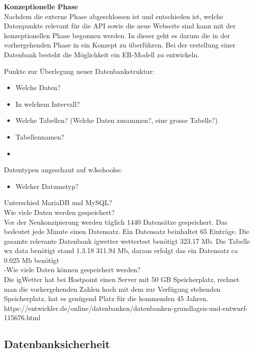 \textbf{Konzeptionelle Phase}\\
Nachdem die externe Phase abgeschlossen ist und entschieden ist, welche Datenpunkte relevant für die API sowie die neue Webseite sind kann mit der konzeptionellen Phase begonnen werden. In dieser geht es darum die in der vorhergehenden Phase in ein Konzept zu überführen. Bei der erstellung einer Datenbank besteht die Möglichkeit ein ER-Modell zu entwickeln. 

Punkte zur Überlegung neuer Datenbankstruktur:
\begin{itemize}
\item Welche Daten?
\item In welchem Intervall?
\item Welche Tabellen? (Welche Daten zusammen?, eine grosse Tabelle?)
\item Tabellennamen?
\item 
\end{itemize}

Datentypen angeschaut auf w3schoolss:
\begin{itemize}
\item Welcher Datumstyp?

\end{itemize}


Unterschied MariaDB und MySQL?\\
Wie viele Daten werden gespeichert?\\
Vor der Neukonzipierung werden täglich 1440 Datensätze gespeichert. Das bedeutet jede Minute einen Datensatz. Ein Datensatz beinhaltet 65 Einträge. Die gesamte relevante Datenbank igwetter wettertest benötigt 323.17  Mb. Die Tabelle wx data benötigt stand 1.3.18 311.94 Mb, daraus erfolgt das ein Datensatz ca 0.025 Mb benötigt \\
-Wie viele Daten können gespeichert werden?\\
Die igWetter hat bei Hostpoint einen Server mit 50 GB Speicherplatz, rechnet man die vorhergehenden Zahlen hoch mit dem zur Verfügung stehenden Speicherplatz, hat es genügend Platz für die kommenden 45 Jahren.\\

https://entwickler.de/online/datenbanken/datenbanken-grundlagen-und-entwurf-115676.html
\\

\subsection{Datenbanksicherheit}
\\

